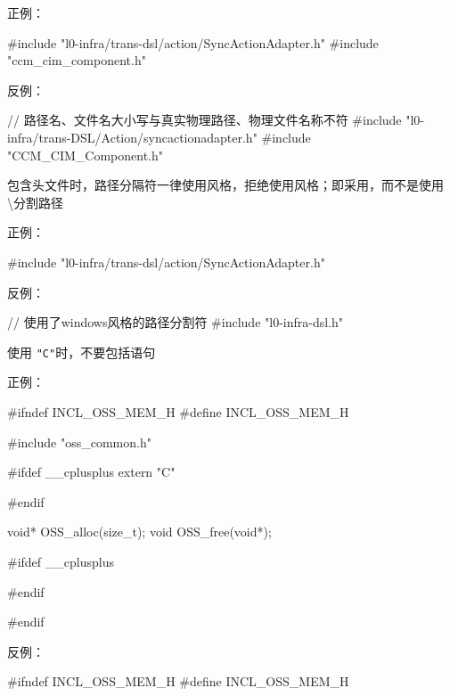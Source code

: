 \begin{content}
正例：
\begin{leftbar}
\begin{c++}
#include "l0-infra/trans-dsl/action/SyncActionAdapter.h"
#include "ccm_cim_component.h"
\end{c++}
\end{leftbar}

反例：
\begin{leftbar}
\begin{c++}
// 路径名、文件名大小写与真实物理路径、物理文件名称不符
#include "l0-infra/trans-DSL/Action/syncactionadapter.h"
#include "CCM_CIM_Component.h"
\end{c++}
\end{leftbar}

\begin{regulation}
包含头文件时，路径分隔符一律使用风格，拒绝使用风格；即采用\code{/}，而不是使用\textbackslash{}分割路径
\end{regulation}

正例：
\begin{leftbar}
\begin{c++}
#include "l0-infra/trans-dsl/action/SyncActionAdapter.h"
\end{c++}
\end{leftbar}

反例：
\begin{leftbar}
\begin{c++}
// 使用了windows风格的路径分割符
#include "l0-infra\trans-dsl\action\SyncActionAdapter.h"
\end{c++}
\end{leftbar}

\begin{regulation}
使用 \texttt{"C"}时，不要包括语句
\end{regulation}

正例：
\begin{leftbar}
\begin{c++}
#ifndef INCL_OSS_MEM_H
#define INCL_OSS_MEM_H

#include "oss_common.h"

#ifdef  __cplusplus
extern "C" {
#endif

void* OSS_alloc(size_t);
void  OSS_free(void*);

#ifdef  __cplusplus
}
#endif

#endif
\end{c++}
\end{leftbar}

反例：
\begin{leftbar}
\begin{c++}
#ifndef INCL_OSS_MEM_H
#define INCL_OSS_MEM_H


\end{c++}
\end{leftbar}
\end{content}

